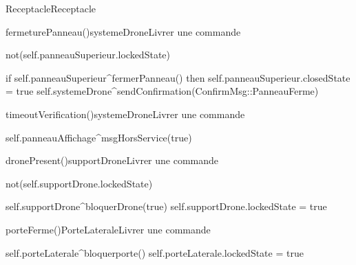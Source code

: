 \begin{OM}{Receptacle}{Receptacle}
    \begin{OMOperation}{fermeturePanneau()}{systemeDrone}{Livrer une commande}
        \begin{OMMessages}
        \end{OMMessages}
        \begin{OMPre}
            not(self.panneauSuperieur.lockedState)
        \end{OMPre}
        \begin{OMPost}
            if self.panneauSuperieur^fermerPanneau() then
            self.panneauSuperieur.closedState = true
            self.systemeDrone^sendConfirmation(ConfirmMsg::PanneauFerme)
        \end{OMPost}
    \end{OMOperation}

    \begin{OMOperation}{timeoutVerification()}{systemeDrone}{Livrer une commande}
        \begin{OMMessages}
        \end{OMMessages}
        \OMNoPre
        \begin{OMPost}
            self.panneauAffichage^msgHorsService(true)
        \end{OMPost}
    \end{OMOperation}

    \begin{OMOperation}{dronePresent()}{supportDrone}{Livrer une commande}
        \begin{OMMessages}
        \end{OMMessages}
        \begin{OMPre}
            not(self.supportDrone.lockedState)
        \end{OMPre}
        \begin{OMPost}
            self.supportDrone^bloquerDrone(true)
            self.supportDrone.lockedState = true
        \end{OMPost}
    \end{OMOperation}

    \begin{OMOperation}{porteFerme()}{PorteLaterale}{Livrer une commande}
        \begin{OMMessages}
        \end{OMMessages}
        \OMNoPre
        \begin{OMPost}
            self.porteLaterale^bloquerporte()
            self.porteLaterale.lockedState = true
        \end{OMPost}
    \end{OMOperation}


\end{OM}
